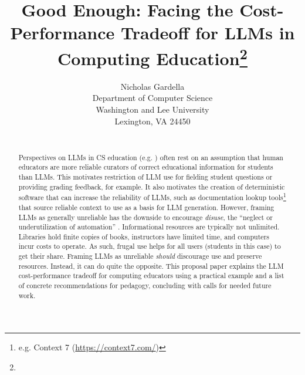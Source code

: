 \documentclass{article}
\title{Good Enough: Facing the Cost-Performance Tradeoff for LLMs in Computing Education\footnote{\protect}
}
\author{
Nicholas Gardella\\
Department of Computer Science\\
Washington and Lee University\\
Lexington, VA 24450\\
\email{ngardella@wlu.edu}\\
}
\begin{document}
\maketitle

\begin{abstract}
Perspectives on LLMs in CS education (e.g. \cite{falknerEffectiveUseLarge2026}) often rest on an assumption that human educators are more reliable curators of correct educational information for students than LLMs. This motivates restriction of LLM use for fielding student questions or providing grading feedback, for example. It also motivates the creation of deterministic software that can increase the reliability of LLMs, such as documentation lookup tools\footnote{e.g. Context 7 (\url{https://context7.com/})} that source reliable context to use as a basis for LLM generation. However, framing LLMs as generally unreliable has the downside to encourage \emph{disuse}, the ``neglect or underutilization of automation'' \cite{parasuramanHumansAutomationUse1997}. Informational resources are typically not unlimited. Libraries hold finite copies of books, instructors have limited time, and computers incur costs to operate. As such, frugal use helps for all users (students in this case) to get their share. Framing LLMs as unreliable \emph{should} discourage use and preserve resources. Instead, it can do quite the opposite. This proposal paper explains the LLM cost-performance tradeoff for computing educators using a practical example and a list of concrete recommendations for pedagogy, concluding with calls for needed future work.
\end{abstract}



\medskip

\begingroup
\sloppy
\printbibliography
\endgroup
\end{document}
